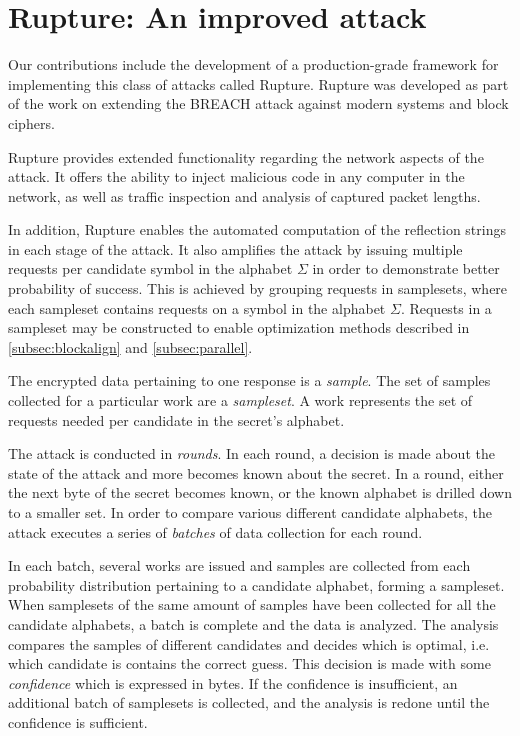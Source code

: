 \section{Rupture: An improved attack}\label{subsec:rupture}
Our contributions include the development of a production-grade framework for
implementing this class of attacks called Rupture. Rupture was developed as
part of the work on extending the BREACH attack against modern systems and block
ciphers.

Rupture provides extended functionality regarding the network aspects of the
attack. It offers the ability to inject malicious code in any computer in the
network, as well as traffic inspection and analysis of captured packet lengths.

In addition, Rupture enables the automated computation of the reflection strings
in each stage of the attack.  It also amplifies the attack by issuing multiple
requests per candidate symbol in the alphabet $\Sigma$ in order to demonstrate
better probability of success. This is achieved by grouping requests in
samplesets, where each sampleset contains requests on a symbol in the alphabet
$\Sigma$. Requests in a sampleset may be constructed to enable optimization
methods described in \ref{subsec:blockalign} and \ref{subsec:parallel}.

The encrypted data pertaining to one response is a \textit{sample}. The set of
samples collected for a particular work are a \textit{sampleset}. A work
represents the set of requests needed per candidate in the secret's alphabet.

The attack is conducted in \textit{rounds}. In each round, a decision is made
about the state of the attack and more becomes known about the secret. In a
round, either the next byte of the secret becomes known, or the known alphabet
is drilled down to a smaller set. In order to compare various different
candidate alphabets, the attack executes a series of \textit{batches} of data
collection for each round.

In each batch, several works are issued and samples are collected from each
probability distribution pertaining to a candidate alphabet, forming a
sampleset. When samplesets of the same amount of samples have been collected for
all the candidate alphabets, a batch is complete and the data is analyzed. The
analysis compares the samples of different candidates and decides which is
optimal, i.e. which candidate is contains the correct guess. This decision is
made with some \textit{confidence} which is expressed in bytes. If the
confidence is insufficient, an additional batch of samplesets is collected, and
the analysis is redone until the confidence is sufficient.

